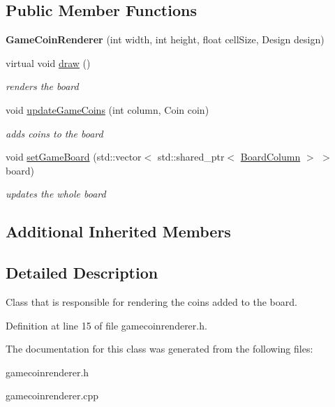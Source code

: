 \subsection*{Public Member Functions}
\begin{DoxyCompactItemize}
\item 
\hypertarget{class_game_coin_renderer_a3426566e0d906524729672836c86f5d2}{{\bfseries Game\-Coin\-Renderer} (int width, int height, float cell\-Size, Design design)}\label{class_game_coin_renderer_a3426566e0d906524729672836c86f5d2}

\item 
\hypertarget{class_game_coin_renderer_a2b1b51d93a38675ee1f30fc6cacbaccd}{virtual void \hyperlink{class_game_coin_renderer_a2b1b51d93a38675ee1f30fc6cacbaccd}{draw} ()}\label{class_game_coin_renderer_a2b1b51d93a38675ee1f30fc6cacbaccd}

\begin{DoxyCompactList}\small\item\em renders the board \end{DoxyCompactList}\item 
\hypertarget{class_game_coin_renderer_a88ecbeec05a81381ee676463fe2aac53}{void \hyperlink{class_game_coin_renderer_a88ecbeec05a81381ee676463fe2aac53}{update\-Game\-Coins} (int column, Coin coin)}\label{class_game_coin_renderer_a88ecbeec05a81381ee676463fe2aac53}

\begin{DoxyCompactList}\small\item\em adds coins to the board \end{DoxyCompactList}\item 
\hypertarget{class_game_coin_renderer_a20a3e2499f4f1656a3e1012ef34e7e89}{void \hyperlink{class_game_coin_renderer_a20a3e2499f4f1656a3e1012ef34e7e89}{set\-Game\-Board} (std\-::vector$<$ std\-::shared\-\_\-ptr$<$ \hyperlink{class_board_column}{Board\-Column} $>$ $>$ board)}\label{class_game_coin_renderer_a20a3e2499f4f1656a3e1012ef34e7e89}

\begin{DoxyCompactList}\small\item\em updates the whole board \end{DoxyCompactList}\end{DoxyCompactItemize}
\subsection*{Additional Inherited Members}


\subsection{Detailed Description}
Class that is responsible for rendering the coins added to the board. 

Definition at line 15 of file gamecoinrenderer.\-h.



The documentation for this class was generated from the following files\-:\begin{DoxyCompactItemize}
\item 
gamecoinrenderer.\-h\item 
gamecoinrenderer.\-cpp\end{DoxyCompactItemize}
